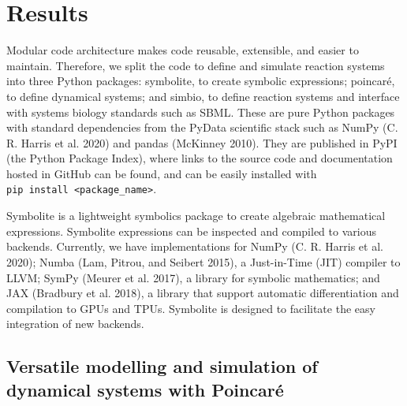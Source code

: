 \documentclass[
  letterpaper,
  DIV=11,
  numbers=noendperiod]{scrartcl}
\begin{document}
\hypertarget{results}{%
\section{Results}\label{results}}

Modular code architecture makes code reusable, extensible, and easier to
maintain. Therefore, we split the code to define and simulate reaction
systems into three Python packages: symbolite, to create symbolic
expressions; poincaré, to define dynamical systems; and simbio, to
define reaction systems and interface with systems biology standards
such as SBML. These are pure Python packages with standard dependencies
from the PyData scientific stack such as NumPy (C. R. Harris et al.
2020) and pandas (McKinney 2010). They are published in PyPI (the Python
Package Index), where links to the source code and documentation hosted
in GitHub can be found, and can be easily installed with
\texttt{pip\ install\ \textless{}package\_name\textgreater{}}.

Symbolite is a lightweight symbolics package to create algebraic
mathematical expressions. Symbolite expressions can be inspected and
compiled to various backends. Currently, we have implementations for
NumPy (C. R. Harris et al. 2020); Numba (Lam, Pitrou, and Seibert 2015),
a Just-in-Time (JIT) compiler to LLVM; SymPy (Meurer et al. 2017), a
library for symbolic mathematics; and JAX (Bradbury et al. 2018), a
library that support automatic differentiation and compilation to GPUs
and TPUs. Symbolite is designed to facilitate the easy integration of
new backends.

\hypertarget{versatile-modelling-and-simulation-of-dynamical-systems-with-poincaruxe9}{%
\subsection{Versatile modelling and simulation of dynamical systems with
Poincaré}\label{versatile-modelling-and-simulation-of-dynamical-systems-with-poincaruxe9}}
\end{document}
